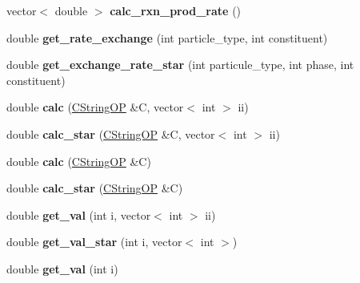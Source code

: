 \begin{DoxyCompactItemize}
\mbox{\label{class_c_m_b_block_ada6055d62b92a328a96bc4e29c5993ba}} 
vector$<$ double $>$ {\bfseries calc\+\_\+rxn\+\_\+prod\+\_\+rate} ()
\item 
\mbox{\label{class_c_m_b_block_accded02f2b4945280c7dfc98c49bbec6}} 
double {\bfseries get\+\_\+rate\+\_\+exchange} (int particle\+\_\+type, int constituent)
\item 
\mbox{\label{class_c_m_b_block_aef1fe91587ead7011a0bfb433fd05829}} 
double {\bfseries get\+\_\+exchange\+\_\+rate\+\_\+star} (int particule\+\_\+type, int phase, int constituent)
\item 
\mbox{\label{class_c_m_b_block_a52f9351df4f0d5c8208a51889bfb672c}} 
double {\bfseries calc} (\hyperlink{class_c_string_o_p}{C\+String\+OP} \&C, vector$<$ int $>$ ii)
\item 
\mbox{\label{class_c_m_b_block_afe66bad13879dac00919f726f7dc615f}} 
double {\bfseries calc\+\_\+star} (\hyperlink{class_c_string_o_p}{C\+String\+OP} \&C, vector$<$ int $>$ ii)
\item 
\mbox{\label{class_c_m_b_block_a5dd85d5ed3a6df4ba00839ce5598e14a}} 
double {\bfseries calc} (\hyperlink{class_c_string_o_p}{C\+String\+OP} \&C)
\item 
\mbox{\label{class_c_m_b_block_aad5b20bf3ac31e8f08b4b82488fa6066}} 
double {\bfseries calc\+\_\+star} (\hyperlink{class_c_string_o_p}{C\+String\+OP} \&C)
\item 
\mbox{\label{class_c_m_b_block_ab53c152bc8e8914c449037cce5677f16}} 
double {\bfseries get\+\_\+val} (int i, vector$<$ int $>$ ii)
\item 
\mbox{\label{class_c_m_b_block_a6c273815dd8f6dd35da7a5be35e09ddc}} 
double {\bfseries get\+\_\+val\+\_\+star} (int i, vector$<$ int $>$)
\item 
\mbox{\label{class_c_m_b_block_ade1d4ce50e0cc1925a8c3c25d55518d2}} 
double {\bfseries get\+\_\+val} (int i)
\item 

\end{DoxyCompactItemize}
